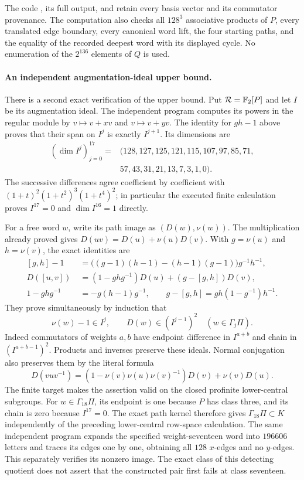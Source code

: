 The code
,
its full output, and
retain every basis vector and its commutator
provenance.
The computation also checks all $128^3$
associative products of $P$, every translated
edge boundary, every canonical word lift,
the four starting paths, and the equality of
the recorded deepest word with its displayed
cycle.  No enumeration of the $2^{136}$
elements of $Q$ is used.

\paragraph{An independent augmentation-ideal upper bound.}
There is a second exact verification of the upper bound.
Put $\mathcal R=\mathbb F_2[P]$ and let $I$ be its augmentation
ideal.  The independent program
computes its powers in the regular module by
$v\mapsto v+xv$ and $v\mapsto v+yv$.
The identity for $gh-1$ above proves that their span
on $I^j$ is exactly $I^{j+1}$.
Its dimensions are
\[
 \begin{aligned}
 (\dim I^j)_{j=0}^{17}
   ={}&(128,127,125,121,115,107,97,85,71,\\
       &57,43,31,21,13,7,3,1,0).
 \end{aligned}
\]
The successive differences agree coefficient by
coefficient with $(1+t)^2(1+t^2)^3(1+t^4)^2$;
in particular the executed finite calculation proves
$I^{17}=0$ and $\dim I^{16}=1$ directly.

For a free word $w$, write its path image as
$(D(w),\nu(w))$.  The multiplication already proved gives
$D(uv)=D(u)+\nu(u)D(v)$.
With $g=\nu(u)$ and $h=\nu(v)$, the exact identities are
\[
 \begin{aligned}
 [g,h]-1
   &\;=\bigl((g-1)(h-1)-(h-1)(g-1)\bigr)g^{-1}h^{-1},\\
 D([u,v])
   &\;=(1-ghg^{-1})D(u)+(g-[g,h])D(v),\\
 1-ghg^{-1}&\;=-g(h-1)g^{-1},\qquad
 g-[g,h]=gh(1-g^{-1})h^{-1}.
 \end{aligned}
\]
They prove simultaneously by induction that
\[
 \nu(w)-1\in I^j,\qquad D(w)\in (I^{j-1})^2
                              \quad(w\in\Gamma_j\Pi).
\]
Indeed commutators of weights $a,b$ have endpoint
difference in $I^{a+b}$ and chain in $(I^{a+b-1})^2$.
Products and inverses preserve these ideals.
Normal conjugation also preserves them by the literal formula
\[
 D(vuv^{-1})
   =(1-\nu(v)\nu(u)\nu(v)^{-1})D(v)+\nu(v)D(u).
\]
The finite target makes the assertion valid on
the closed profinite lower-central subgroups.
For $w\in\Gamma_{18}\Pi$, its endpoint is one
because $P$ has class three, and its chain is zero
because $I^{17}=0$.
The exact path kernel therefore gives
$\Gamma_{18}\Pi\subset K$ independently of the
preceding lower-central row-space calculation.
The same independent program expands the specified
weight-seventeen word into $196606$ letters and
traces its edges one by one, obtaining all $128$
$x$-edges and no $y$-edges.
This separately verifies its nonzero image.
The exact class of this detecting quotient does
not assert that the constructed pair first fails
at class seventeen.
